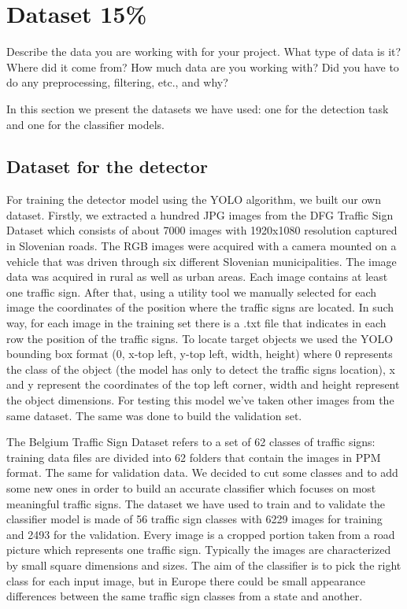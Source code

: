 \section{Dataset 15\%}
Describe the data you are working with for your project. What type of data is it? Where did it come from? How much data are you working with? Did you have to do any preprocessing, filtering, etc., and why?

In this section we present the datasets we have used: one for the detection task and one for the classifier models. 

\subsection{Dataset for the detector}
For training the detector model using the YOLO algorithm, we built our own dataset. Firstly, we extracted a hundred JPG images from the DFG Traffic Sign Dataset which consists of about 7000 images with 1920x1080 resolution captured in Slovenian roads. The RGB images were acquired with a camera mounted on a vehicle that was driven through six different Slovenian municipalities. The image data was acquired in rural as well as urban areas. Each image contains at least one traffic sign. After that, using a utility tool we manually selected for each image the coordinates of the position where the traffic signs are located. In such way, for each image in the training set there is a .txt file that indicates in each row the position of the traffic signs. To locate target objects we used the YOLO bounding box format (0, x-top left, y-top left, width, height) where 0 represents the class of the object (the model has only to detect the traffic signs location), x and y represent the coordinates of the top left corner, width and height represent the object dimensions. For testing this model we've taken other images from the same dataset. The same was done to build the validation set.

The Belgium Traffic Sign Dataset refers to a set of 62 classes of traffic signs: training data files are divided into 62 folders that contain the images in PPM format. The same for validation data. We decided to cut some classes and to add some new ones in order to build an accurate classifier which focuses on most meaningful traffic signs. The dataset we have used to train and to validate the classifier model is made of 56 traffic sign classes with 6229 images for training and 2493 for the validation. Every image is a cropped portion taken from a road picture which represents one traffic sign. Typically the images are characterized by small square dimensions and sizes. The aim of the classifier is to pick the right class for each input image, but in Europe there could be small appearance differences between the same traffic sign classes from a state and another. 

